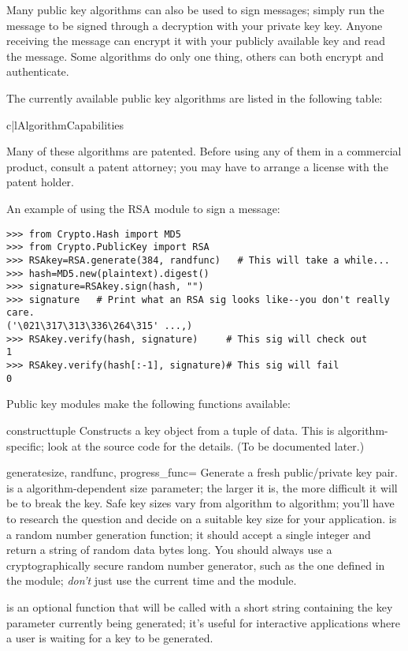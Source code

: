 \documentclass{howto}
\begin{document}
Many public key algorithms can also be used to sign messages; simply
run the message to be signed through a decryption with your private
key key.  Anyone receiving the message can encrypt it with your
publicly available key and read the message.  Some algorithms do only
one thing, others can both encrypt and authenticate.

The currently available public key algorithms are listed in the
following table:

\begin{tableii}{c|l}{}{Algorithm}{Capabilities}
\end{tableii}

Many of these algorithms are patented.  Before using any of them in a
commercial product, consult a patent attorney; you may have to arrange
a license with the patent holder.

An example of using the RSA module to sign a message:
\begin{verbatim}
>>> from Crypto.Hash import MD5
>>> from Crypto.PublicKey import RSA
>>> RSAkey=RSA.generate(384, randfunc)   # This will take a while...
>>> hash=MD5.new(plaintext).digest()
>>> signature=RSAkey.sign(hash, "")
>>> signature   # Print what an RSA sig looks like--you don't really care.
('\021\317\313\336\264\315' ...,)
>>> RSAkey.verify(hash, signature)     # This sig will check out
1
>>> RSAkey.verify(hash[:-1], signature)# This sig will fail
0
\end{verbatim}

       
Public key modules make the following functions available:

\begin{funcdesc}{construct}{tuple}
Constructs a key object from a tuple of data.  This is
algorithm-specific; look at the source code for the details.  (To be
documented later.)
\end{funcdesc}

\begin{funcdesc}{generate}{size, randfunc, progress_func=}
Generate a fresh public/private key pair.   is a
algorithm-dependent size parameter; the larger it is, the more
difficult it will be to break the key.  Safe key sizes vary from
algorithm to algorithm; you'll have to research the question and
decide on a suitable key size for your application.  
is a random number generation function; it should accept a single
integer  and return a string of random data  bytes long.
You should always use a cryptographically secure random number
generator, such as the one defined in the  module;
\emph{don't} just use the current time and the  module.

 is an optional function that will be called with a short
string containing the key parameter currently being generated; it's
useful for interactive applications where a user is waiting for a key to
be generated.
\end{funcdesc}
\end{document}
